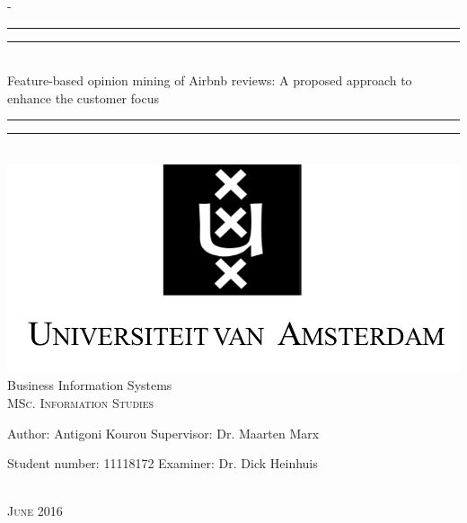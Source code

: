 %
% 
%
%
%
\let\cleardoublepage\clearpage
\begin{titlingpage}
\begin{SingleSpace}
\calccentering{\unitlength} 
\begin{adjustwidth*}{\unitlength}{-\unitlength}
\vspace*{13mm}
\begin{center}
\rule[0.5ex]{\linewidth}{2pt}\vspace*{-\baselineskip}\vspace*{3.2pt}
\rule[0.5ex]{\linewidth}{1pt}\\[\baselineskip]
{\huge Feature-based opinion mining of Airbnb reviews: A proposed approach to enhance the customer focus}\\[4mm]
\rule[0.5ex]{\linewidth}{1pt}\vspace*{-\baselineskip}\vspace{3.2pt}
\rule[0.5ex]{\linewidth}{2pt}\\
\vspace{6.5mm}
\vspace{13mm}
 \includegraphics[scale=0.6]{logos/UvA}\\
\vspace{4mm}
{\large Business Information Systems\\
\textsc{MSc. Information Studies}}\\
\vspace{4cm}
\begin{minipage}{14cm}
{\large Author: Antigoni Kourou \hspace{30mm} Supervisor: Dr. Maarten Marx

Student number: 11118172 \hspace{27mm} Examiner: Dr. Dick Heinhuis} 
\end{minipage}\\
\vspace{30mm}
{\large\textsc{June 2016}}
\end{center}
\end{adjustwidth*}
\end{SingleSpace}
\end{titlingpage}
\clearemptydoublepage 